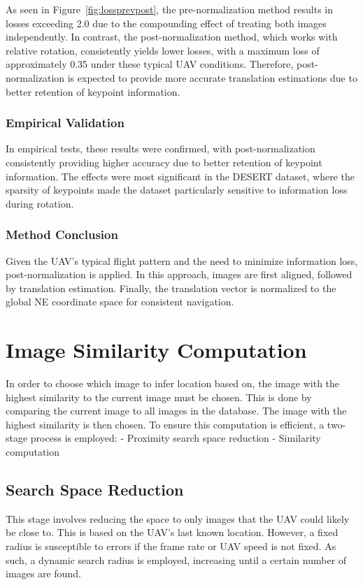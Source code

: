 As seen in Figure~\ref{fig:lossprevpost}, the pre-normalization method results in losses exceeding 2.0 due to the compounding effect of treating both images independently. In contrast, the post-normalization method, which works with relative rotation, consistently yields lower losses, with a maximum loss of approximately 0.35 under these typical UAV conditions. Therefore, post-normalization is expected to provide more accurate translation estimations due to better retention of keypoint information.




\subsubsection*{Empirical Validation}

In empirical tests, these results were confirmed, with post-normalization consistently providing higher accuracy due to better retention of keypoint information. The effects were most significant in the DESERT dataset, where the sparsity of keypoints made the dataset particularly sensitive to information loss during rotation. 

\subsubsection*{Method Conclusion}

Given the UAV's typical flight pattern and the need to minimize information loss, post-normalization is applied. In this approach, images are first aligned, followed by translation estimation. Finally, the translation vector is normalized to the global NE coordinate space for consistent navigation.




\section*{Image Similarity Computation}

In order to choose which image to infer location based on, the image with the highest similarity to the current image must be chosen. This is done by comparing the current image to all images in the database. The image with the highest similarity is then chosen.
To ensure this computation is efficient, a two-stage process is employed:
- Proximity search space reduction
- Similarity computation


\subsection*{Search Space Reduction}
This stage involves reducing the space to only images that the UAV could likely be close to. This is based on the UAV's last known location. However, a fixed radius is susceptible to errors if the frame rate or UAV speed is not fixed. As such, a dynamic search radius is employed, increasing until a certain number of images are found. 


